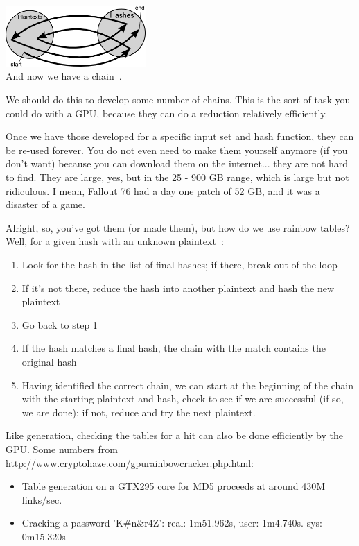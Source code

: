\begin{center}
	\includegraphics[width=0.4\textwidth]{images/rainbow-tables-chain.png}\\
	And now we have a chain~\cite{rainbowtables}.
\end{center}

We should do this to develop some number of chains. This is the sort of task you could do with a GPU, because they can do a reduction relatively efficiently. 

Once we have those developed for a specific input set and hash function, they can be re-used forever. You do not even need to make them yourself anymore (if you don't want) because you can download them on the internet... they are not hard to find. They are large, yes, but in the 25 - 900 GB range, which is large  but not ridiculous. I mean, Fallout 76 had a day one patch of 52 GB, and it was a disaster of a game.

Alright, so, you've got them (or made them), but how do we use rainbow tables? Well, for a given hash with an unknown plaintext~\cite{rainbowtables}:
\begin{enumerate}
	\item Look for the hash in the list of final hashes; if there, break out of the loop
	\item If it's not there, reduce the hash into another plaintext and hash the new plaintext
	\item Go back to step 1
	\item If the hash matches a final hash, the chain with the match contains the original hash
	\item Having identified the correct chain, we can start at the beginning of the chain with the starting plaintext and hash, check to see if we are successful (if so, we are done); if not, reduce and try the next plaintext. 
\end{enumerate} 

Like generation, checking the tables for a hit can also be done efficiently by the GPU. Some numbers from \url{http://www.cryptohaze.com/gpurainbowcracker.php.html}: 
\begin{itemize}
	\item Table generation on a GTX295 core for MD5 proceeds at around 430M links/sec.
	\item Cracking a password 'K\#n\&r4Z': real: 1m51.962s, user: 1m4.740s. sys: 0m15.320s
\end{itemize}

